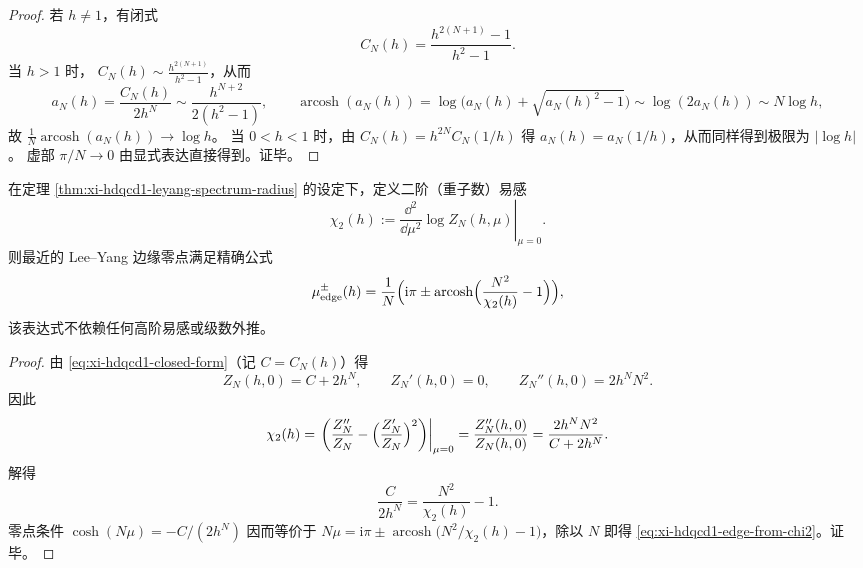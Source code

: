 \begin{proof}
若 \(h\neq 1\)，有闭式
\[
C_N(h)=\frac{h^{2(N+1)}-1}{h^{2}-1}.
\]
当 \(h>1\) 时，
\(
C_N(h)\sim \frac{h^{2(N+1)}}{h^{2}-1}
\)，从而
\[
a_N(h)=\frac{C_N(h)}{2h^{N}}
\sim \frac{h^{N+2}}{2(h^{2}-1)},
\qquad
\operatorname{arcosh}(a_N(h))
=\log\!\bigl(a_N(h)+\sqrt{a_N(h)^{2}-1}\bigr)
\sim \log(2a_N(h))
\sim N\log h,
\]
故 \(\frac{1}{N}\operatorname{arcosh}(a_N(h))\to \log h\)。
当 \(0<h<1\) 时，由 \(C_N(h)=h^{2N}C_N(1/h)\) 得 \(a_N(h)=a_N(1/h)\)，从而同样得到极限为 \(|\log h|\)。
虚部 \(\pi/N\to 0\) 由显式表达直接得到。证毕。
\end{proof}

\begin{proposition}\label{prop:xi-hdqcd1-edge-from-chi2}
在定理 \ref{thm:xi-hdqcd1-leyang-spectrum-radius} 的设定下，定义二阶（重子数）易感
\begin{equation}\label{eq:xi-hdqcd1-chi2-def}
\chi_2(h):=\left.\frac{\dd^{2}}{\dd\mu^{2}}\log Z_N(h,\mu)\right|_{\mu=0}.
\end{equation}
则最近的 Lee--Yang 边缘零点满足精确公式
\begin{equation}\label{eq:xi-hdqcd1-edge-from-chi2}
\mu_{\mathrm{edge}}^{\pm}(h)
=\frac{1}{N}\Bigl(\mathrm{i}\pi\pm \operatorname{arcosh}\Bigl(\frac{N^{2}}{\chi_2(h)}-1\Bigr)\Bigr),
\end{equation}
该表达式不依赖任何高阶易感或级数外推。
\end{proposition}

\begin{proof}
由 \eqref{eq:xi-hdqcd1-closed-form}（记 \(C=C_N(h)\)）得
\[
Z_N(h,0)=C+2h^{N},\qquad
Z_N'(h,0)=0,\qquad
Z_N''(h,0)=2h^{N}N^{2}.
\]
因此
\[
\chi_2(h)
=\left.\left(\frac{Z_N''}{Z_N}-\Bigl(\frac{Z_N'}{Z_N}\Bigr)^{2}\right)\right|_{\mu=0}
=\frac{Z_N''(h,0)}{Z_N(h,0)}
=\frac{2h^{N}N^{2}}{C+2h^{N}}.
\]
解得
\[
\frac{C}{2h^{N}}=\frac{N^{2}}{\chi_2(h)}-1.
\]
零点条件 \(\cosh(N\mu)=-C/(2h^{N})\) 因而等价于
\(
N\mu=\mathrm{i}\pi\pm \operatorname{arcosh}\bigl(N^{2}/\chi_2(h)-1\bigr)
\)，除以 \(N\) 即得 \eqref{eq:xi-hdqcd1-edge-from-chi2}。证毕。
\end{proof}

